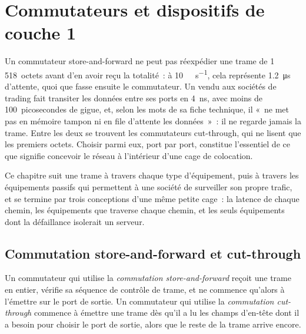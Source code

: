 \chapter{Commutateurs et dispositifs de couche 1}\label{ch:nw:switches-and-layer-1-devices}

Un commutateur store-and-forward ne peut pas réexpédier une trame de 1\,518~octets avant d'en avoir reçu la totalité~: à
\qty{10}{\giga\bit\per\second}, cela représente \qty{1.2}{\micro\second} d'attente, quoi que fasse ensuite le commutateur. Un 
vendu aux sociétés de trading fait transiter les données entre ses ports en \qty{4}{\nano\second}, avec moins de 100~picosecondes de gigue, et, selon les
mots de sa fiche technique, il «~ne met pas en mémoire tampon ni en file d'attente les données~»~: il ne regarde jamais la trame. Entre les deux se trouvent les
commutateurs cut-through, qui ne lisent que les premiers octets. Choisir parmi eux, port par port, constitue l'essentiel de ce que
signifie concevoir le réseau à l'intérieur d'une cage de colocation.

Ce chapitre suit une trame à travers chaque type d'équipement, puis à travers les équipements passifs qui permettent à une société de surveiller son propre
trafic, et se termine par trois conceptions d'une même petite cage~: la latence de chaque chemin, les équipements que traverse chaque chemin, et les
seuls équipements dont la défaillance isolerait un serveur.

\section{Commutation store-and-forward et cut-through}

\begin{definition}\label{def:nw:switches-and-layer-1-devices:modes}
Un commutateur qui utilise la \emph{commutation store-and-forward} reçoit une trame en entier, vérifie sa
séquence de contrôle de trame, et ne commence qu'alors à l'émettre sur le port de sortie. Un commutateur qui utilise la \emph{commutation
cut-through} commence à émettre une trame dès qu'il a lu les champs d'en-tête dont il a besoin pour choisir
le port de sortie, alors que le reste de la trame arrive encore.
\end{definition}

